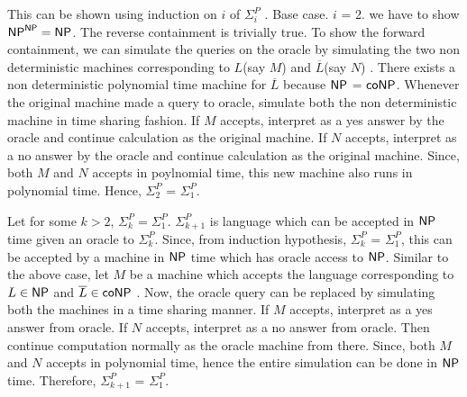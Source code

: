 \documentclass[12pt]{exam}
\begin{document}
\begin{questions}
\begin{solution}
 This can be shown using induction on $i$ of $\Sigma_{i}^{P}$ .\newline
 Base case. $i$ = 2. \newline
 we have to show ${\mathsf{NP}}^{\mathsf{NP}} = {\mathsf{NP}}$.
 The reverse containment is trivially true. To show the forward containment, we can simulate the queries on the oracle by simulating the two non deterministic
 machines corresponding to $L$(say $M$) and $\overline{L}$(say $N$) . There exists a non deterministic polynomial time machine for $\overline{L}$ because ${\mathsf{NP}}$ = ${\mathsf{co}}{\mathsf{NP}}$. \newline
 Whenever the original machine made a query to oracle, simulate both the non deterministic machine in time sharing fashion. If $M$ accepts, interpret as a yes answer by
 the oracle and continue calculation as the original machine. If $N$ accepts, interpret as a no answer by the oracle and continue calculation as the original machine.
 Since, both $M$ and $N$ accepts in poylnomial time, this new machine also runs in polynomial time. Hence, $\Sigma_{2}^{P}$ = $\Sigma_{1}^{P}$. \newline
 
 Let for some $k > 2$, $\Sigma_{k}^{P} = \Sigma_{1}^{P}$.\newline
 $\Sigma_{k+1}^{P}$ is language which can be accepted in ${\mathsf{NP}}$ time given an oracle to $\Sigma_{k}^{P}$. Since, from induction hypothesis, $\Sigma_{k}^{P}$
  = $\Sigma_{1}^{P}$, this can be accepted by a machine in ${\mathsf{NP}}$ time which has oracle access to ${\mathsf{NP}}$. Similar to the above case, let $M$ be a machine
  which accepts the language corresponding to $L \in {\ensuremath{\mathsf{NP}}}$ and $\overline{L} \in {\ensuremath{\mathsf{co}}}{\ensuremath{\mathsf{NP}}}$ . Now, the oracle query can be replaced by simulating both the machines
  in a time sharing manner. If $M$ accepts, interpret as a yes answer from oracle. If $N$ accepts, interpret as a no answer from oracle. Then continue
  computation normally as the oracle machine from there. Since, both $M$ and $N$ accepts in polynomial time, hence the entire simulation can be done in ${\mathsf{NP}}$ time.
  Therefore, $\Sigma_{k+1}^{P}$ = $\Sigma_{1}^{P}$.
 
 
 
\end{solution}


\question[10]
\end{questions}
\end{document}
